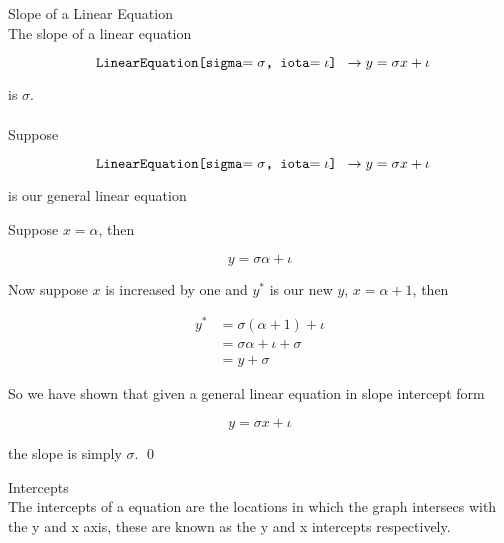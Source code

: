 \documentclass{book}
\begin{document}
  {\theorem Slope of a Linear Equation \\
    The slope of a linear equation

    $$\text{\texttt{ LinearEquation[sigma$= {\sigma}$, iota$= {\iota}$] }}\to y = {\sigma}x + {\iota}$$

    is $\sigma$.\\

    \proof\\

    Suppose

    $$\text{\texttt{ LinearEquation[sigma$= {\sigma}$, iota$= {\iota}$] }}\to y = {\sigma}x + {\iota}$$

    is our general linear equation

    Suppose $x = \alpha$, then

    $$y = \sigma \alpha + \iota$$

    Now suppose $x$ is increased by one and $y^*$ is our new $y$, $x = \alpha + 1$, then

    \begin{align*}
      y^* & = \sigma (\alpha + 1) + \iota\\
      & = \sigma \alpha + \iota + \sigma\\
      & = y + \sigma
    \end{align*}

    So we have shown that given a general linear equation in slope intercept form

    $$y = \sigma x + \iota$$

    the slope is simply $\sigma$. \qed\\
  }

  {\remark Intercepts \\
    The intercepts of a equation are the locations in which the graph intersecs with the y and x axis, these are known as the y and x intercepts respectively.\\
  }
\end{document}
